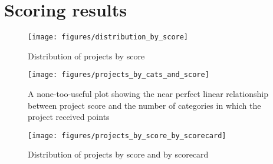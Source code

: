 \documentclass[10pt, letterpaper, final, twoside, onecolumn]{memoir}%
\begin{document}
 
\chapter{Scoring results}
\lipsum[1-2]

\begin{figure}[htbp]
\begin{center}
\texttt{[image: figures/distribution\_by\_score]}

\caption{Distribution of projects by score}
\label{fig:distribution_by_score}
\end{center}
\end{figure}



\begin{figure}[htbp]
\begin{center}
\texttt{[image: figures/projects\_by\_cats\_and\_score]}

\caption{A none-too-useful plot showing the near perfect linear relationship between project score and the number of categories in which the project received points}
\label{fig:projects_by_cats_and_score}
\end{center}
\end{figure}



 
\begin{figure}[htbp]
\begin{center}
\texttt{[image: figures/projects\_by\_score\_by\_scorecard]}

\caption{Distribution of projects by score and by scorecard}
\label{fig:projects_by_score_by_scorecard}
\end{center}
\end{figure}
\end{document}
